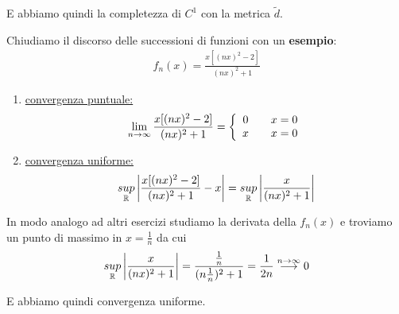 E abbiamo quindi la completezza di $C^1$ con la metrica $\tilde{d}$.

\bigskip

Chiudiamo il discorso delle successioni di funzioni con un \textbf{esempio}:
\begin{align}
	f_n(x)= \frac{x[(nx)^2 -2]}{(nx)^2 +1}
\end{align}

\begin{enumerate}
	\item \underline{convergenza puntuale:}
	\begin{align}
		\underset{n \rightarrow \infty}{\lim} \,\frac{x[(nx)^2 -2]}{(nx)^2 +1}= \left\{\begin{array}{cc} 0 \quad {}&x=0 \\ x \quad &x=0 \end{array}\right.
	\end{align}
	\item \underline{convergenza uniforme:}
	\begin{align}
		\underset{\mathbb{R}}{sup}\left| \frac{x[(nx)^2 -2]}{(nx)^2 +1} -x \right| = \underset{\mathbb{R}}{sup}\left| \frac{x}{(nx)^2 +1} \right|
	\end{align}
\end{enumerate}

In modo analogo ad altri esercizi studiamo la derivata della $f_n(x)$ e troviamo un punto di massimo in $x= \frac{1}{n}$ da cui
\begin{align}
	\underset{\mathbb{R}}{sup}\left| \frac{x}{(nx)^2 +1} \right| = \frac{\frac{1}{n}}{(n\frac{1}{n})^2 +1} = \frac{1}{2n} \overset{n \rightarrow \infty}{\longrightarrow}0
\end{align}

E abbiamo quindi convergenza uniforme.

